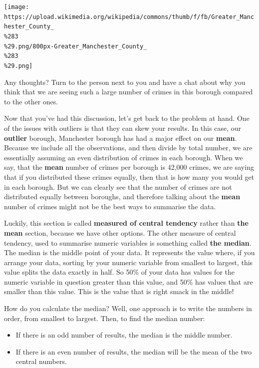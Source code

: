 \documentclass[
]{book}
\providecommand{\tightlist}{%
  \setlength{\itemsep}{0pt}\setlength{\parskip}{0pt}}
\begin{document}
\texttt{[image: https://upload.wikimedia.org/wikipedia/commons/thumb/f/fb/Greater\_Manchester\_County\_\\\%283\\\%29.png/800px-Greater\_Manchester\_County\_\\\%283\\\%29.png]}

Any thoughts? Turn to the person next to you and have a chat about why you think that we are seeing such a large number of crimes in this borough compared to the other ones.

Now that you've had this discussion, let's get back to the problem at hand. One of the issues with outliers is that they can skew your results. In this case, our \textbf{outlier} borough, Manchester borough has had a major effect on our \textbf{mean}. Because we include all the observations, and then divide by total number, we are essentially assuming an even distribution of crimes in each borough. When we say, that the \textbf{mean} number of crimes per borough is 42,000 crimes, we are saying that if you distributed these crimes equally, then that is how many you would get in each borough. But we can clearly see that the number of crimes are not distributed equally between boroughs, and therefore talking about the \textbf{mean} number of crimes might not be the best ways to summarise the data.

Luckily, this section is called \textbf{measured of central tendency} rather than \textbf{the mean} section, because we have other options. The other measure of central tendency, used to summarise numeric variables is something called \textbf{the median}. The median is the middle point of your data. It represents the value where, if you arrange your data, sorting by your numeric variable from smallest to largest, this value splits the data exactly in half. So 50\% of your data has values for the numeric variable in question greater than this value, and 50\% has values that are smaller than this value. This is the value that is right smack in the middle!

How do you calculate the median? Well, one approach is to write the numbers in order, from smallest to largest. Then, to find the median number:

\begin{itemize}
\tightlist
\item
  If there is an odd number of results, the median is the middle number.
\item
  If there is an even number of results, the median will be the mean of the two central numbers.
\end{itemize}
\end{document}

